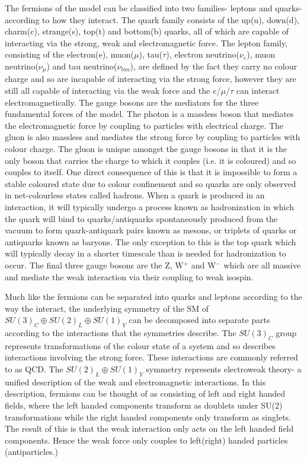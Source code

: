 The fermions of the model can be classified into two families- leptons and quarks- according to how they interact. The quark family consists of the up(u), down(d), charm(c), strange(s), top(t) and bottom(b) quarks, all of which are capable of interacting via the strong, weak and electromagnetic force. The lepton family, consisting of the electron(e), muon($\mu$), tau($\tau$), electron neutrino($\nu_{e}$), muon neutrino($\nu_{\mu}$) and tau neutrino($\nu_{tau}$), are defined by the fact they carry no colour charge and so are incapable of interacting via the strong force, however they are still all capable of interacting via the weak force and the $e$/$\mu$/$\tau$ can interact electromagnetically. The gauge bosons are the mediators for the three fundamental forces of the model. The photon is a massless boson that mediates the electromagnetic force by coupling to particles with electrical charge. The gluon is also massless and mediates the strong force by coupling to particles with colour charge. The gluon is unique amongst the gauge bosons in that it is the only boson that carries the charge to which it couples (i.e. it is coloured) and so couples to itself. One direct consequence of this is that it is impossible to form a stable coloured state due to colour confinement and so quarks are only observed in net-colourless states called hadrons. When a quark is produced in an interaction, it will typically undergo a process known as hadronization in which the quark will bind to quarks/antiquarks spontaneously produced from the vacuum to form quark-antiquark pairs known as mesons, or triplets of quarks or antiquarks known as baryons. The only exception to this is the top quark which will typically decay in a shorter timescale than is needed for hadronization to occur. The final three gauge bosons are the Z, W$^+$ and W$^-$ which are all massive and mediate the weak interaction via their coupling to weak isospin.

Much like the fermions can be separated into quarks and leptons according to the way the interact, the underlying symmetry of the \ac{SM} of $SU(3)_{C}\oplus SU(2)_{L}\oplus SU(1)_{Y}$ can be decomposed into separate parts according to the interactions that the symmetries describe. The $SU(3)_{C}$ group represents transformations of the colour state of a system and so describes interactions involving the strong force. These interactions are commonly referred to as \ac{QCD}. The $SU(2)_{L}\oplus SU(1)_{Y}$ symmetry represents electroweak theory- a unified description of the weak and electromagnetic interactions. In this description, fermions can be thought of as consisting of left and right handed fields, where the left handed components transform as doublets under SU(2) transformations while the right handed components only transform as singlets. The result of this is that the weak interaction only acts on the left handed field components. Hence the weak force only couples to left(right) handed particles (antiparticles.) 


